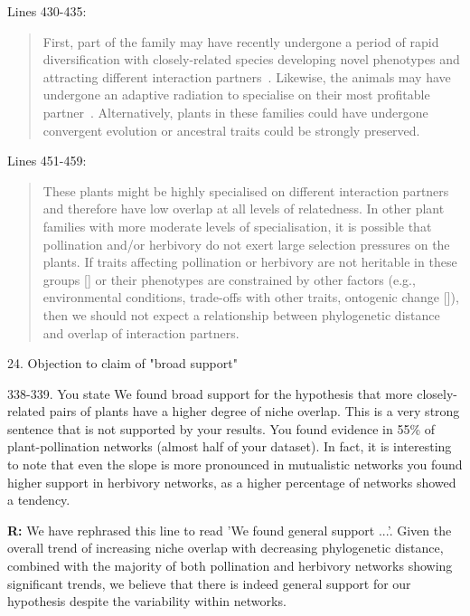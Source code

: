 \documentclass[12pt]{letter}
\newenvironment{refquote}{\bigskip \begin{it}}{\end{it}\smallskip}
\begin{document}
		Lines 430-435:

		\begin{quotation}

			First, part of the family may have recently 
			undergone a period of rapid diversification with closely-related species 
			developing novel phenotypes and attracting different  
			interaction partners~\citep{Linder2008,Breitkopf2015}. Likewise, the
			animals may have undergone an adaptive radiation to 
			specialise on their most profitable partner~\citep{Janz2006}. 
			Alternatively, plants in these families could have undergone convergent evolution or ancestral traits could be strongly preserved.

		\end{quotation}


		Lines 451-459:

		\begin{quotation}

			These plants might 
			be highly specialised on different interaction partners and therefore
			have low overlap at all levels of relatedness. In other plant families
			with more moderate levels of specialisation, it is possible 
			that pollination and/or herbivory do not exert large
			selection pressures on the plants. If traits affecting pollination
			or herbivory are not heritable in these groups [\citealp{Kursar2009}] 
			or their phenotypes are constrained by other factors (e.g., 
			environmental conditions, trade-offs with other traits, ontogenic
			change [\citealp{Karinho2014}]), then we should not expect a relationship 
			between phylogenetic distance and overlap of interaction partners.

		\end{quotation}


	24. Objection to claim of "broad support"

		\begin{refquote}
			338-339. You state We found broad support for the hypothesis that more closely-related pairs of plants have a higher degree of niche overlap. This is a very strong sentence that is not supported by your results. You found evidence in 55\% of plant-pollination networks (almost half of your dataset). In fact, it is interesting to note that even the slope is more pronounced in mutualistic networks you found higher support in herbivory networks, as a higher percentage of networks showed a tendency.
		\end{refquote}


		\textbf{R:} We have rephrased this line to read 'We found general support ...'. Given the overall trend of increasing niche overlap with decreasing phylogenetic distance, combined with the majority of both pollination and herbivory networks showing significant trends, we believe that there is indeed general support for our hypothesis despite the variability within networks. 
\end{document}
